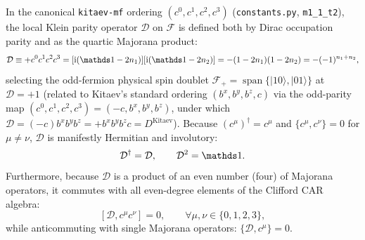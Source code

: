 \begin{definition}
\label{def:m1_1_fermion_parity}
In the canonical \texttt{kitaev-mf} ordering $(c^0, c^1, c^2, c^3)$ (\texttt{constants.py}, \texttt{m1\_1\_t2}), the local Klein parity operator $\mathcal{D}$ on $\mathcal{F}$ is defined both by Dirac occupation parity and as the quartic Majorana product:
\begin{equation}
\label{eq:m1_1_parity_def}
\mathcal{D} \equiv +c^0 c^1 c^2 c^3 = [\ii(\Id - 2n_1)][\ii(\Id - 2n_2)] = -(1 - 2n_1)(1 - 2n_2) = -(-1)^{n_1 + n_2},
\end{equation}
selecting the odd-fermion physical spin doublet $\mathcal{F}_+ = \operatorname{span}\{|10\rangle, |01\rangle\}$ at $\mathcal{D} = +1$ (related to Kitaev's standard ordering $(b^x, b^y, b^z, c)$ via the odd-parity map $(c^0, c^1, c^2, c^3) = (-c, b^x, b^y, b^z)$, under which $\mathcal{D} = (-c) b^x b^y b^z = +b^x b^y b^z c = D^{\mathrm{Kitaev}}$). Because $(c^\mu)^\dagger = c^\mu$ and $\{c^\mu, c^\nu\} = 0$ for $\mu \neq \nu$, $\mathcal{D}$ is manifestly Hermitian and involutory:
\begin{equation}
\label{eq:m1_1_parity_properties}
\mathcal{D}^\dagger = \mathcal{D}, \qquad \mathcal{D}^2 = \Id.
\end{equation}
Furthermore, because $\mathcal{D}$ is a product of an even number (four) of Majorana operators, it commutes with all even-degree elements of the Clifford CAR algebra:
\begin{equation}
\label{eq:m1_1_parity_commutation_even}
[\mathcal{D}, c^\mu c^\nu] = 0, \qquad \forall \mu, \nu \in \{0, 1, 2, 3\},
\end{equation}
while anticommuting with single Majorana operators: $\{\mathcal{D}, c^\mu\} = 0$.
\end{definition}

